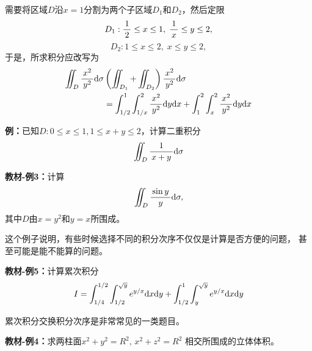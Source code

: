 需要将区域$D$沿$x=1$分割为两个子区域$D_1$和$D_2$，然后定限
$$D_1:\displaystyle\frac{\,{1}\,}{\,{2}\,}\leq x\leq 1,\;\displaystyle\frac{\,{1}\,}{\,{x}\,}\leq y\leq 2,$$
$$D_2:1\leq x\leq 2,\;x\leq y\leq 2,$$
于是，所求积分应改写为
\begin{align*}
	\iint_D\displaystyle\frac{\,{x^2}\,}{\,{y^2}\,}\mathrm{d}\sigma&
	\left(\iint_{D_1}+\iint_{D_2}\right)\displaystyle\frac{\,{x^2}\,}{\,{y^2}\,}\mathrm{d}\sigma\\
	&=\displaystyle\int_{1/2}^1\displaystyle\int_{1/x}^2\displaystyle\frac{\,{x^2}\,}{\,{y^2}\,}\mathrm{d} y\mathrm{d} x
	+\displaystyle\int_1^2\displaystyle\int_x^2\displaystyle\frac{\,{x^2}\,}{\,{y^2}\,}\mathrm{d} y\mathrm{d} x
\end{align*}

{\bf 例：}已知$D:0\leq x\leq 1,1\leq x+y\leq 2$，计算二重积分
$$\iint_D\displaystyle\frac{\,{1}\,}{\,{x+y}\,}\mathrm{d}\sigma$$

{\bf 教材-例3：}计算
$$\iint_D\displaystyle\frac{\,{\sin y}\,}{\,{y}\,}\mathrm{d}\sigma,$$
其中$D$由$x=y^2$和$y=x$所围成。

这个例子说明，有些时候选择不同的积分次序不仅仅是计算是否方便的问题，
甚至可能是能不能算的问题。

{\bf 教材-例5：}计算累次积分
$$I=\int_{1/4}^{1/2}\int_{1/2}^{\sqrt y}e^{y/x}\mathrm{d} x\mathrm{d} y+
\int_{1/2}^1\int_y^{\sqrt y}e^{y/x}\mathrm{d} x\mathrm{d} y$$

累次积分交换积分次序是非常常见的一类题目。

{\bf 教材-例4：}求两柱面$x^2+y^2=R^2,\, x^2+z^2=R^2$
相交所围成的立体体积。

\begin{center}
\end{center}

